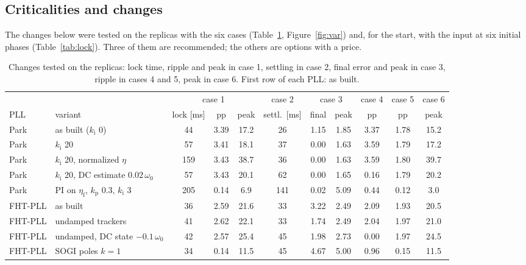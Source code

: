 \documentclass[11pt,a4paper]{scrartcl}
\newcommand{\ped}[1]{_{\mathrm{#1}}}
\begin{document}
\begin{onehalfspace}
\section{Criticalities and changes}
\label{sec:crit}

The changes below were tested on the replicas with the six cases (Table~\ref{tab:var}, Figure~\ref{fig:var}) and, for the start, with the input at six initial phases (Table~\ref{tab:lock}). Three of them are recommended; the others are options with a price.

\begin{table}[H]
	\centering
	\caption{Changes tested on the replicas: lock time, ripple and peak in case 1, settling in case 2, final error and peak in case 3, ripple in cases 4 and 5, peak in case 6. First row of each PLL: as built.}
	\label{tab:var}
	\footnotesize
	\setlength{\tabcolsep}{3.5pt}
	\begin{tabular}{@{} l l c c c c c c c c c @{}}
		\toprule
		 & & \multicolumn{3}{c}{case 1} & case 2 & \multicolumn{2}{c}{case 3} & case 4 & case 5 & case 6 \\
		PLL & variant & lock [ms] & pp & peak & settl.\ [ms] & final & peak & pp & pp & peak \\
		\midrule
		Park & as built ($k\ped{i}$ 0) & 44 & 3.39 & 17.2 & 26 & 1.15 & 1.85 & 3.37 & 1.78 & 15.2 \\
		Park & $k\ped{i}$ 20 & 57 & 3.41 & 18.1 & 37 & 0.00 & 1.63 & 3.59 & 1.79 & 17.2 \\
		Park & $k\ped{i}$ 20, normalized $\eta$ & 159 & 3.43 & 38.7 & 36 & 0.00 & 1.63 & 3.59 & 1.80 & 39.7 \\
		Park & $k\ped{i}$ 20, DC estimate $0.02\,\omega_0$ & 57 & 3.43 & 20.1 & 62 & 0.00 & 1.65 & 0.16 & 1.79 & 20.2 \\
		Park & PI on $\eta\ped{f}$, $k\ped{p}$ 0.3, $k\ped{i}$ 3 & 205 & 0.14 & 6.9 & 141 & 0.02 & 5.09 & 0.44 & 0.12 & 3.0 \\
		FHT-PLL & as built & 36 & 2.59 & 21.6 & 33 & 3.22 & 2.49 & 2.09 & 1.93 & 20.5 \\
		FHT-PLL & undamped trackers & 41 & 2.62 & 22.1 & 33 & 1.74 & 2.49 & 2.04 & 1.97 & 21.0 \\
		FHT-PLL & undamped, DC state $-0.1\,\omega_0$ & 42 & 2.57 & 25.4 & 45 & 1.98 & 2.73 & 0.00 & 1.97 & 24.5 \\
		FHT-PLL & SOGI poles $k = 1$ & 34 & 0.14 & 11.5 & 45 & 4.67 & 5.00 & 0.96 & 0.15 & 11.5 \\

\end{tabular}
\end{table}
\end{onehalfspace}
\end{document}
